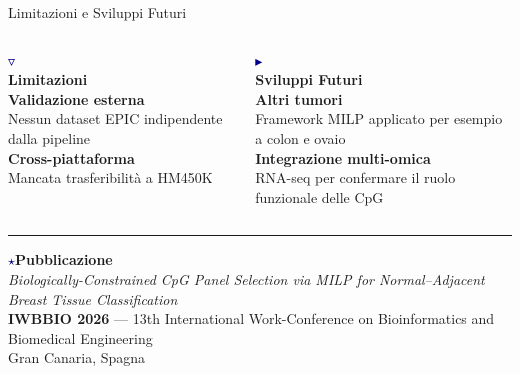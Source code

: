 \documentclass{beamer}
\begin{document}
\begin{frame}{Limitazioni e Sviluppi Futuri}

\vspace{1em}

\begin{columns}[t, onlytextwidth]

\centering
{\large \textcolor{darkblue}{$\triangledown$}}\\[4pt]
{\footnotesize \textbf{Limitazioni}}\\[0.8em]

{\scriptsize
\textbf{Validazione esterna}\\
Nessun dataset EPIC indipendente dalla pipeline\\[0.6em]
\textbf{Cross-piattaforma}\\
Mancata trasferibilità a HM450K
}

\centering
{\large \textcolor{darkblue}{$\blacktriangleright$}}\\[4pt]
{\footnotesize \textbf{Sviluppi Futuri}}\\[0.8em]

{\scriptsize
\textbf{Altri tumori}\\
Framework MILP applicato per esempio a colon e ovaio\\[0.6em]
\textbf{Integrazione multi-omica}\\
RNA-seq per confermare il ruolo funzionale delle CpG
}

\end{columns}

\vspace{1.2em}
\hrule
\vspace{0.8em}

\centering
{\footnotesize \textcolor{darkblue}{$\star$}\quad \textbf{Pubblicazione}}\\[0.4em]
{\scriptsize
\textit{Biologically-Constrained CpG Panel Selection via MILP for
Normal--Adjacent Breast Tissue Classification}\\[0.2em]
\textbf{IWBBIO 2026} — 13th International Work-Conference on
Bioinformatics and Biomedical Engineering\\
Gran Canaria, Spagna
}

\end{frame}




\backmatter

\appendix
\end{document}
